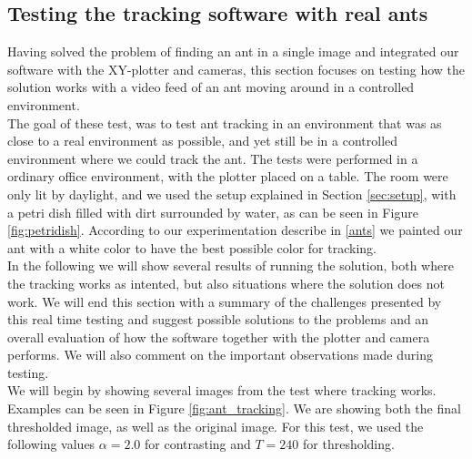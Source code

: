 
% 
% 


\subsection{Testing the tracking software with real ants}
\label{testing}

Having solved the problem of finding an ant in a single image and integrated our software with the XY-plotter and cameras, this section focuses on testing how the solution works with a video feed of an ant moving around in a controlled environment.\\

The goal of these test, was to test ant tracking in an environment that was as close to a real environment as possible, and yet still be in a controlled environment where we could track the ant. The tests were performed in a ordinary office environment, with the plotter placed on a table. The room were only lit by daylight, and we used the setup explained in Section \ref{sec:setup}, with a petri dish filled with dirt surrounded by water, as can be seen in Figure \ref{fig:petridish}. According to our experimentation describe in \ref{ants} we painted our ant with a white color to have the best possible color for tracking. \\

In the following we will show several results of running the solution, both where the tracking works as intented, but also situations where the solution does not work. We will end this section with a summary of the challenges presented by this real time testing and suggest possible solutions to the problems and an overall evaluation of how the software together with the plotter and camera performs. We will also comment on the important observations made during testing.\\

We will begin by showing several images from the test where tracking works. Examples can be seen in Figure \ref{fig:ant_tracking}. We are showing both the final thresholded image, as well as the original image. For this test, we used the following values $\alpha = 2.0$ for contrasting and $T = 240$ for thresholding.\\

